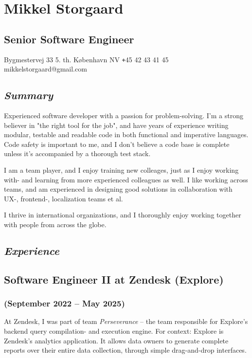 \documentclass[10pt, a4paper]{article}
\begin{document}
\section*{Mikkel Storgaard}
\subsection*{Senior Software Engineer}
Bygmestervej 33 5. th.  København NV \newline
\texttt{+}45 42 43 41 45 \newline
mikkelstorgaard@gmail.com
\subsection*{\textit{Summary}}
Experienced software developer with a passion for problem-solving. I'm a strong believer in "the right tool for the job", and have years of experience writing modular, testable and readable code in both functional and imperative languages.
Code safety is important to me, and I don't believe a code base is complete unless it's accompanied by a thorough test stack.

I am a team player, and I enjoy training new colleages, just as I enjoy working with- and learning from more experienced colleagues as well.
I like working across teams, and am experienced in designing good solutions in collaboration with UX-, frontend-, localization teams et al.

I thrive in international organizations, and I thoroughly enjoy working together with people from across the globe.

\subsection*{\textit{Experience}}
\subsection*{Software Engineer II at Zendesk (Explore)}
\subsubsection*{{\normalfont(September 2022 -- May 2025)}}
At Zendesk, I was part of team \textit{Perseverance} -- the team responsible for Explore's backend query compilation- and execution engine. 
For context: Explore is Zendesk's analytics application. It allows data owners to generate complete reports over their entire data collection, through simple drag-and-drop interfaces.
\end{document}
